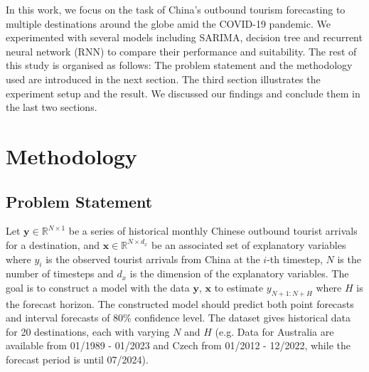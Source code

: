 \documentclass{article}
\begin{document}
In this work, we focus on the task of China's outbound tourism forecasting to multiple destinations around the globe amid the COVID-19 pandemic. We experimented with several models including SARIMA, decision tree and recurrent neural network (RNN) to compare their performance and suitability.
The rest of this study is organised as follows: The problem statement and the methodology used are introduced in the next section. The third section illustrates the experiment setup and the result. We discussed our findings and conclude them in the last two sections.

\section{Methodology}
\subsection{Problem Statement}
Let $\mathbf{y} \in \mathbb{R}^{N \times 1}$ be a series of historical monthly Chinese outbound tourist arrivals for a destination, and $\mathbf{x} \in \mathbb{R}^{N \times d_x}$ be an associated set of explanatory variables where $y_i$ is the observed tourist arrivals from China at the $i$-th timestep, $N$ is the number of timesteps and $d_x$ is the dimension of the explanatory variables. The goal is to construct a model with the data $\mathbf{y}$, $\mathbf{x}$ to estimate $y_{N+1: N+H}$ where $H$ is the forecast horizon. The constructed model should predict both point forecasts and interval forecasts of 80\% confidence level. The dataset gives historical data for 20 destinations, each with varying $N$ and $H$ (e.g. Data for Australia are available from 01/1989 - 01/2023 and Czech from 01/2012 - 12/2022, while the forecast period is until 07/2024).
\end{document}
